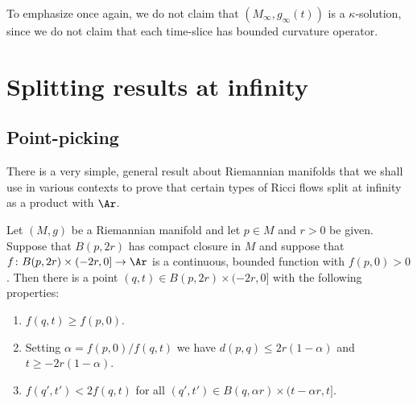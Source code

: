 To emphasize once again, we do not claim that $(M_\infty,g_\infty(t))$ is a
$\kappa$-solution, since we do not claim that each time-slice has bounded
curvature operator.

\section{Splitting results at infinity}


\subsection{Point-picking}

There is a very simple, general result about Riemannian manifolds
that we shall use in various contexts to prove that certain types of
Ricci flows split at infinity as a product with $\Ar$.


\begin{lemma}\label{lem:point-picking-general}
\label{4times}
Let $(M,g)$ be a Riemannian manifold  and let $p\in M$ and $r>0$ be
given. Suppose that $B(p,2r)$ has compact closure in $M$ and suppose
that $f\colon B(p,2r)\times (-2r,0]\to \Ar$ is a continuous, bounded
function with $f(p,0)>0$. Then there is a point $(q,t)\in
B(p,2r)\times (-2r,0]$ with the following properties:
\begin{enumerate}
\item[(1)] $f(q,t)\ge f(p,0)$.
\item[(2)] Setting $\alpha=f(p,0)/f(q,t)$ we have $d(p,q)\le 2r(1-\alpha)$
and $t\ge -2r(1-\alpha)$.
\item[(3)] $f(q',t')<2f(q,t)$ for all $(q',t')\in B(q,\alpha r)\times (t-\alpha r,t]$.
\end{enumerate}
\end{lemma}


